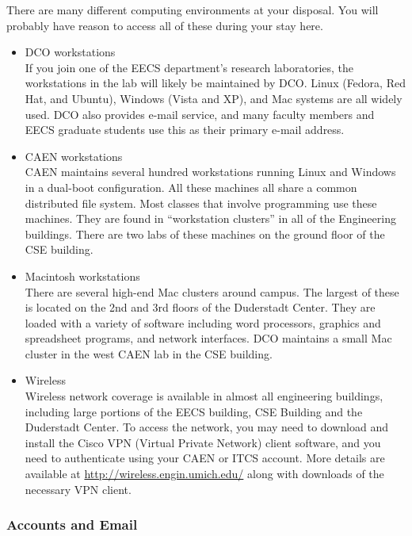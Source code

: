 \documentclass[11pt]{article}
\begin{document}
There are many different computing environments at your disposal. You will probably have reason to access all of these during your stay here.
\begin{itemize}

\item DCO workstations\\
\label{sec-7_1_4_1}%
If you join one of the EECS department's research laboratories, the
workstations in the lab will likely be maintained by DCO.  Linux
(Fedora, Red Hat, and Ubuntu), Windows (Vista and XP), and Mac systems
are all widely used.  DCO also provides e-mail service, and many
faculty members and EECS graduate students use this as their primary
e-mail address.


\item CAEN workstations\\
\label{sec-7_1_4_2}%
CAEN maintains several hundred workstations running Linux and Windows
in a dual-boot configuration.  All these machines all share a common
distributed file system.  Most classes that involve programming use
these machines.  They are found in “workstation clusters” in all of
the Engineering buildings.  There are two labs of these machines on
the ground floor of the CSE building.


\item Macintosh workstations\\
\label{sec-7_1_4_3}%
There are several high-end Mac clusters around campus.  The largest of
these is located on the 2nd and 3rd floors of the Duderstadt Center.
They are loaded with a variety of software including word processors,
graphics and spreadsheet programs, and network interfaces.  DCO
maintains a small Mac cluster in the west CAEN lab in the CSE
building.


\item Wireless\\
\label{sec-7_1_4_4}%
Wireless network coverage is available in almost all engineering
buildings, including large portions of the EECS building, CSE Building
and the Duderstadt Center.  To access the network, you may need to
download and install the Cisco VPN (Virtual Private Network) client
software, and you need to authenticate using your CAEN or ITCS
account.  More details are available at
\href{http://wireless.engin.umich.edu/}{http://wireless.engin.umich.edu/} along with downloads of the necessary
VPN client.
\end{itemize} %
\subsubsection{Accounts and Email}
\label{sec-7_1_5}
\end{document}
